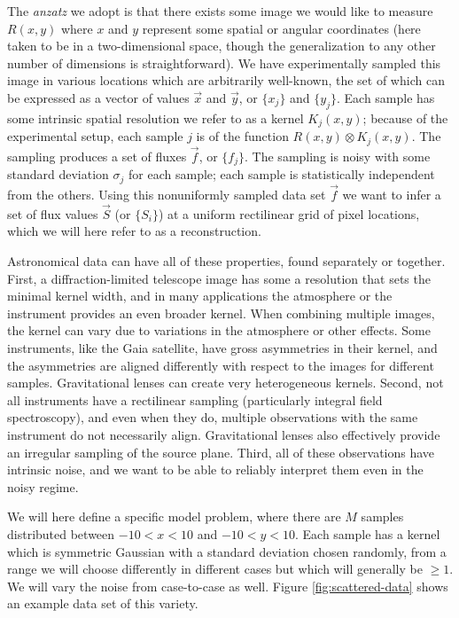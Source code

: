 \documentclass[twocolumn,tighten]{aastex61}
\begin{document}
The {\it anzatz} we adopt is that there exists some image we would
like to measure $R(x, y)$ where $x$ and $y$ represent some spatial or
angular coordinates (here taken to be in a two-dimensional space,
though the generalization to any other number of dimensions is
straightforward). We have experimentally sampled this image in various
locations which are arbitrarily well-known, the set of which can be
expressed as a vector of values $\vec{x}$ and $\vec{y}$, or $\{x_j\}$
and $\{y_j\}$. Each sample has some intrinsic spatial resolution we
refer to as a kernel $K_j(x, y)$; because of the experimental setup,
each sample $j$ is of the function $R(x, y)\otimes K_j(x,y)$. The
sampling produces a set of fluxes $\vec{f}$, or $\{f_j\}$. The
sampling is noisy with some standard deviation $\sigma_j$ for each
sample; each sample is statistically independent from the
others. Using this nonuniformly sampled data set $\vec{f}$ we want to
infer a set of flux values $\vec{S}$ (or $\{S_i\}$) at a uniform
rectilinear grid of pixel locations, which we will here refer to as a
reconstruction.

Astronomical data can have all of these properties, found separately
or together. First, a diffraction-limited telescope image has some a
resolution that sets the minimal kernel width, and in many
applications the atmosphere or the instrument provides an even broader
kernel. When combining multiple images, the kernel can vary due to
variations in the atmosphere or other effects. Some instruments, like
the Gaia satellite, have gross asymmetries in their kernel, and the
asymmetries are aligned differently with respect to the images for
different samples. Gravitational lenses can create very heterogeneous
kernels. Second, not all instruments have a rectilinear sampling
(particularly integral field spectroscopy), and even when they do,
multiple observations with the same instrument do not necessarily
align. Gravitational lenses also effectively provide an irregular
sampling of the source plane. Third, all of these observations have
intrinsic noise, and we want to be able to reliably interpret them
even in the noisy regime.

We will here define a specific model problem, where there are $M$
samples distributed between $-10 < x <10$ and $-10 < y < 10$. Each
sample has a kernel which is symmetric Gaussian with a standard
deviation chosen randomly, from a range we will choose differently in
different cases but which will generally be $\ge 1$. We will vary the
noise from case-to-case as well.  Figure \ref{fig:scattered-data}
shows an example data set of this variety.
\end{document}
